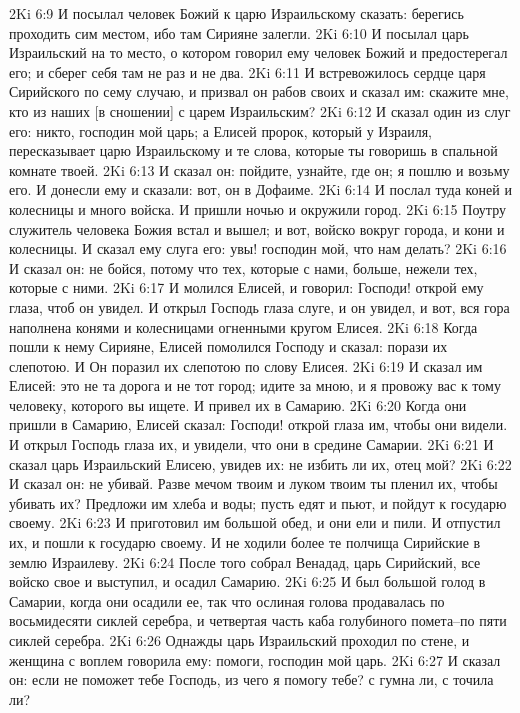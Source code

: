 2Ki 6:9  И посылал человек Божий к царю Израильскому сказать: берегись проходить сим местом, ибо там Сирияне залегли.
2Ki 6:10  И посылал царь Израильский на то место, о котором говорил ему человек Божий и предостерегал его; и сберег себя там не раз и не два.
2Ki 6:11  И встревожилось сердце царя Сирийского по сему случаю, и призвал он рабов своих и сказал им: скажите мне, кто из наших [в сношении] с царем Израильским?
2Ki 6:12  И сказал один из слуг его: никто, господин мой царь; а Елисей пророк, который у Израиля, пересказывает царю Израильскому и те слова, которые ты говоришь в спальной комнате твоей.
2Ki 6:13  И сказал он: пойдите, узнайте, где он; я пошлю и возьму его. И донесли ему и сказали: вот, он в Дофаиме.
2Ki 6:14  И послал туда коней и колесницы и много войска. И пришли ночью и окружили город.
2Ki 6:15  Поутру служитель человека Божия встал и вышел; и вот, войско вокруг города, и кони и колесницы. И сказал ему слуга его: увы! господин мой, что нам делать?
2Ki 6:16  И сказал он: не бойся, потому что тех, которые с нами, больше, нежели тех, которые с ними.
2Ki 6:17  И молился Елисей, и говорил: Господи! открой ему глаза, чтоб он увидел. И открыл Господь глаза слуге, и он увидел, и вот, вся гора наполнена конями и колесницами огненными кругом Елисея.
2Ki 6:18  Когда пошли к нему Сирияне, Елисей помолился Господу и сказал: порази их слепотою. И Он поразил их слепотою по слову Елисея.
2Ki 6:19  И сказал им Елисей: это не та дорога и не тот город; идите за мною, и я провожу вас к тому человеку, которого вы ищете. И привел их в Самарию.
2Ki 6:20  Когда они пришли в Самарию, Елисей сказал: Господи! открой глаза им, чтобы они видели. И открыл Господь глаза их, и увидели, что они в средине Самарии.
2Ki 6:21  И сказал царь Израильский Елисею, увидев их: не избить ли их, отец мой?
2Ki 6:22  И сказал он: не убивай. Разве мечом твоим и луком твоим ты пленил их, чтобы убивать их? Предложи им хлеба и воды; пусть едят и пьют, и пойдут к государю своему.
2Ki 6:23  И приготовил им большой обед, и они ели и пили. И отпустил их, и пошли к государю своему. И не ходили более те полчища Сирийские в землю Израилеву.
2Ki 6:24  После того собрал Венадад, царь Сирийский, все войско свое и выступил, и осадил Самарию.
2Ki 6:25  И был большой голод в Самарии, когда они осадили ее, так что ослиная голова продавалась по восьмидесяти сиклей серебра, и четвертая часть каба голубиного помета--по пяти сиклей серебра.
2Ki 6:26  Однажды царь Израильский проходил по стене, и женщина с воплем говорила ему: помоги, господин мой царь.
2Ki 6:27  И сказал он: если не поможет тебе Господь, из чего я помогу тебе? с гумна ли, с точила ли?
